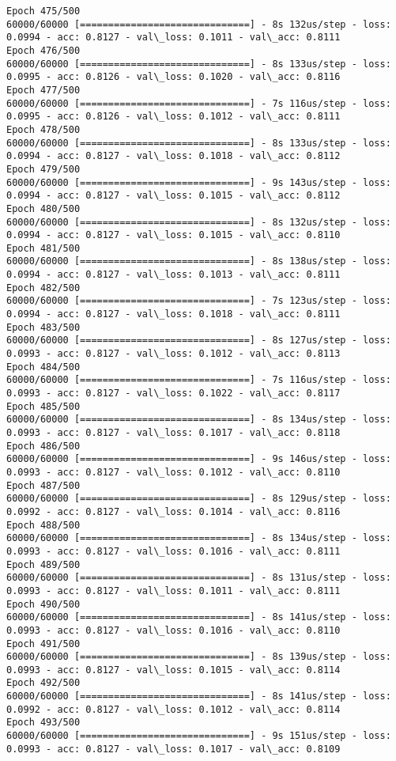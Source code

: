 \documentclass[11pt]{article}
\begin{document}
\begin{Verbatim}[commandchars=\\\{\}]
Epoch 475/500
60000/60000 [==============================] - 8s 132us/step - loss: 0.0994 - acc: 0.8127 - val\_loss: 0.1011 - val\_acc: 0.8111
Epoch 476/500
60000/60000 [==============================] - 8s 133us/step - loss: 0.0995 - acc: 0.8126 - val\_loss: 0.1020 - val\_acc: 0.8116
Epoch 477/500
60000/60000 [==============================] - 7s 116us/step - loss: 0.0995 - acc: 0.8126 - val\_loss: 0.1012 - val\_acc: 0.8111
Epoch 478/500
60000/60000 [==============================] - 8s 133us/step - loss: 0.0994 - acc: 0.8127 - val\_loss: 0.1018 - val\_acc: 0.8112
Epoch 479/500
60000/60000 [==============================] - 9s 143us/step - loss: 0.0994 - acc: 0.8127 - val\_loss: 0.1015 - val\_acc: 0.8112
Epoch 480/500
60000/60000 [==============================] - 8s 132us/step - loss: 0.0994 - acc: 0.8127 - val\_loss: 0.1015 - val\_acc: 0.8110
Epoch 481/500
60000/60000 [==============================] - 8s 138us/step - loss: 0.0994 - acc: 0.8127 - val\_loss: 0.1013 - val\_acc: 0.8111
Epoch 482/500
60000/60000 [==============================] - 7s 123us/step - loss: 0.0994 - acc: 0.8127 - val\_loss: 0.1018 - val\_acc: 0.8111
Epoch 483/500
60000/60000 [==============================] - 8s 127us/step - loss: 0.0993 - acc: 0.8127 - val\_loss: 0.1012 - val\_acc: 0.8113
Epoch 484/500
60000/60000 [==============================] - 7s 116us/step - loss: 0.0993 - acc: 0.8127 - val\_loss: 0.1022 - val\_acc: 0.8117
Epoch 485/500
60000/60000 [==============================] - 8s 134us/step - loss: 0.0993 - acc: 0.8127 - val\_loss: 0.1017 - val\_acc: 0.8118
Epoch 486/500
60000/60000 [==============================] - 9s 146us/step - loss: 0.0993 - acc: 0.8127 - val\_loss: 0.1012 - val\_acc: 0.8110
Epoch 487/500
60000/60000 [==============================] - 8s 129us/step - loss: 0.0992 - acc: 0.8127 - val\_loss: 0.1014 - val\_acc: 0.8116
Epoch 488/500
60000/60000 [==============================] - 8s 134us/step - loss: 0.0993 - acc: 0.8127 - val\_loss: 0.1016 - val\_acc: 0.8111
Epoch 489/500
60000/60000 [==============================] - 8s 131us/step - loss: 0.0993 - acc: 0.8127 - val\_loss: 0.1011 - val\_acc: 0.8111
Epoch 490/500
60000/60000 [==============================] - 8s 141us/step - loss: 0.0993 - acc: 0.8127 - val\_loss: 0.1016 - val\_acc: 0.8110
Epoch 491/500
60000/60000 [==============================] - 8s 139us/step - loss: 0.0993 - acc: 0.8127 - val\_loss: 0.1015 - val\_acc: 0.8114
Epoch 492/500
60000/60000 [==============================] - 8s 141us/step - loss: 0.0992 - acc: 0.8127 - val\_loss: 0.1012 - val\_acc: 0.8114
Epoch 493/500
60000/60000 [==============================] - 9s 151us/step - loss: 0.0993 - acc: 0.8127 - val\_loss: 0.1017 - val\_acc: 0.8109

\end{Verbatim}
\end{document}
